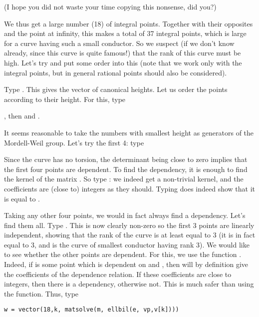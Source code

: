 (I hope you did not waste your time copying this nonsense, did you?)

We thus get a large number (18) of integral points. Together with their
opposites and the point at infinity, this makes a total of 37 integral
points, which is large for a curve having such a small conductor. So we
suspect (if we don't know already, since this curve is quite famous!) that
the rank of this curve must be high. Let's try and put some order into this
(note that we work only with the integral points, but in general rational
points should also be considered).

Type . This gives the vector of canonical heights.
Let us order the points according to their height. For this, type

, then  and
.

It seems reasonable to take the numbers with smallest height as generators of
the Mordell-Weil group. Let's try the first 4: type


Since the curve has no torsion, the determinant being close to zero implies
that the first four points are dependent. To find the dependency, it is
enough to find the kernel of the matrix . So type :
we indeed get a non-trivial kernel, and the coefficients are (close to)
integers as they should. Typing  does indeed show
that it is equal to .

Taking any other four points, we would in fact always find a dependency.
Let's find them all. Type . This is now clearly non-zero so the first 3 points
are linearly independent, showing that the rank of the curve is at least
equal to 3 (it is in fact equal to 3, and  is the curve of smallest
conductor having rank 3). We would like to see whether the other points are
dependent. For this, we use the function . Indeed, if  is
some point which is dependent on  and , then
 will by definition give the coefficients
of the dependence relation. If these coefficients are close to integers, then
there is a dependency, otherwise not.  This is much safer than using the
 function. Thus, type

\centerline{\tt w = vector(18,k, matsolve(m, ellbil(e, vp,v[k])))}

